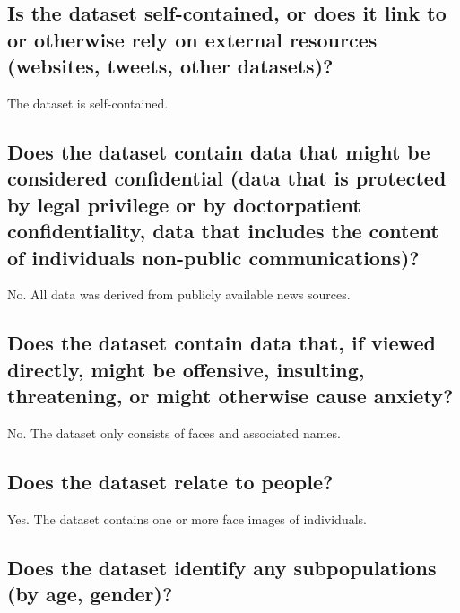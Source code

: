 \subsection*{Is the dataset self-contained, or does it link to or otherwise rely on external resources (\eg websites, tweets, other datasets)?}
\noindent The dataset is self-contained.

\subsection*{Does the dataset contain data that might be considered confidential (\eg data that is protected by legal privilege or by doctorpatient confidentiality, data that includes the content of individuals non-public communications)?}

\noindent No. All data was derived from publicly available news sources. 

\subsection*{Does the dataset contain data that, if viewed directly, might be offensive, insulting, threatening, or might otherwise cause anxiety?}
No. The dataset only consists of faces and associated names.

\subsection*{Does the dataset relate to people?}
\noindent Yes. The dataset contains one or more face images of individuals.


\subsection*{Does the dataset identify any subpopulations (\eg by age, gender)?}

